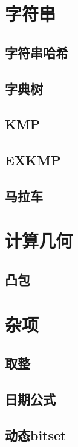 \section{字符串}
\subsection{字符串哈希}


\subsection{字典树}

\subsection{KMP}


\subsection{EXKMP}


\subsection{马拉车}


\section{计算几何}
\subsection{凸包}


\section{杂项}
\subsection{取整}

\subsection{日期公式}

\subsection{动态bitset}

